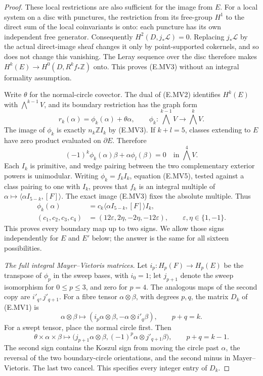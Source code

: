 \begin{proof}
These local restrictions are also sufficient for the image
from $E$. For a local system on a disc with punctures, the
restriction from its free-group $H^1$ to the direct sum of
the local coinvariants is onto: each puncture has its own
independent free generator. Consequently
$H^2(D,j_*\mathcal L)=0$. Replacing $j_*\mathcal L$ by the
actual direct-image sheaf changes it only by point-supported
cokernels, and so does not change this vanishing.
The Leray sequence over the disc therefore makes
$H^k(E)\to H^0(D,R^kf_*\mathbb Z)$ onto. This proves
(E.MV3) without an integral formality assumption.

Write $\theta$ for the normal-circle covector. The dual of
(E.MV2) identifies $H^k(E)$ with $\bigwedge^{k-1}V$, and
its boundary restriction has the graph form
\[
 r_k(\alpha)=\phi_k(\alpha)+\theta\alpha,
 \qquad
 \phi_k:\bigwedge^{k-1}V\longrightarrow\bigwedge^kV.
 \tag{E.MV4}
\]
The image of $\phi_k$ is exactly $n_k\mathbb Z I_k$ by
(E.MV3). If $k+l=5$, classes extending to $E$ have zero
product evaluated on $\partial E$. Therefore
\[
 (-1)^k\phi_k(\alpha)\beta+
                    \alpha\phi_l(\beta)=0
 \quad\text{in }\bigwedge^4V.
 \tag{E.MV5}
\]
Each $I_k$ is primitive, and wedge pairing between the two
complementary exterior powers is unimodular. Writing
$\phi_k=f_k I_k$, equation (E.MV5), tested against a class
pairing to one with $I_k$, proves that $f_k$ is an integral
multiple of $\alpha\mapsto\langle\alpha I_{5-k},[F]\rangle$.
The exact image (E.MV3) fixes the absolute multiple. Thus
\[
 \begin{split}
 \phi_k(\alpha)&=c_k
       \langle\alpha I_{5-k},[F]\rangle I_k,\\
 (c_1,c_2,c_3,c_4)&=(12\varepsilon,2\eta,-2\eta,-12\varepsilon),
 \qquad \varepsilon,\eta\in\{1,-1\}.
 \end{split}
 \tag{E.MV6}
\]
This proves every boundary map up to two signs. We allow those
signs independently for $E$ and $E'$ below; the answer is the
same for all sixteen possibilities.

\emph{The full integral Mayer--Vietoris matrices.}
Let $i_p:H_p(F)\to H_p(E)$ be the transpose of $\phi_p$ in
the sweep bases, with $i_0=1$; let $j_{p+1}$ denote the sweep
isomorphism for $0\leq p\leq3$, and zero for $p=4$.
The analogous maps of the second copy are $i'_q,j'_{q+1}$.
For a fibre tensor $\alpha\otimes\beta$, with degrees $p,q$,
the matrix $D_k$ of (E.MV1) is
\[
 \alpha\otimes\beta\longmapsto
  (i_p\alpha\otimes\beta,-\alpha\otimes i'_q\beta),
 \qquad p+q=k.
 \tag{E.MV7}
\]
For a swept tensor, place the normal circle first. Then
\[
 \theta\times\alpha\times\beta\longmapsto
 \bigl(j_{p+1}\alpha\otimes\beta,
                 (-1)^p\alpha\otimes j'_{q+1}\beta\bigr),
 \qquad p+q=k-1.
 \tag{E.MV8}
\]
The second sign contains the Koszul sign from moving the circle
past $\alpha$, the reversal of the two boundary-circle
orientations, and the second minus in Mayer--Vietoris. The last
two cancel. This specifies every integer entry of $D_k$.


\end{proof}
